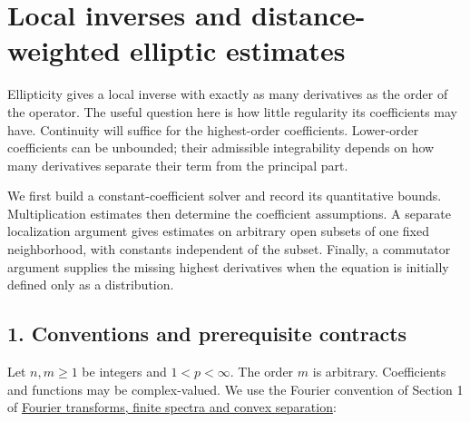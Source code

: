 \documentclass[
  11pt,
]{article}
\author{}
\date{}
\makeatletter
\let\ReaderOriginalAnchorStart\hyper@anchorstart
\let\ReaderOriginalAnchorEnd\hyper@anchorend
\let\ReaderPendingAliases\@empty
\def\ReaderArmAliases#1{\gdef\ReaderPendingAliases{#1}}
\def\hyper@anchorstart#1{\ReaderIfNativeAnchorTF{#1}{\ReaderPendingAliases\global\let\ReaderPendingAliases\@empty}{}\ReaderOriginalAnchorStart{#1}}
\makeatother
\begin{document}
\ReaderArmAliases{\ReaderOriginalAnchorStart{local-inverses-and-distance-weighted-elliptic-estimates}\ReaderOriginalAnchorEnd}
\section{Local inverses and distance-weighted elliptic
estimates}\label{local-inverses-and-distance-weighted-elliptic-estimates}

Ellipticity gives a local inverse with exactly as many derivatives as
the order of the operator. The useful question here is how little
regularity its coefficients may have. Continuity will suffice for the
highest-order coefficients. Lower-order coefficients can be unbounded;
their admissible integrability depends on how many derivatives separate
their term from the principal part.

We first build a constant-coefficient solver and record its quantitative
bounds. Multiplication estimates then determine the coefficient
assumptions. A separate localization argument gives estimates on
arbitrary open subsets of one fixed neighborhood, with constants
independent of the subset. Finally, a commutator argument supplies the
missing highest derivatives when the equation is initially defined only
as a distribution.

\ReaderArmAliases{\ReaderOriginalAnchorStart{AN03-LCE-001}\ReaderOriginalAnchorEnd\begingroup\expandafter\def\csname @currentHref\endcsname{AN03-LCE-001}\label{AN03-LCE-001}\endgroup\ReaderOriginalAnchorStart{an03-lce-001-conventions-and-prerequisite-contracts}\ReaderOriginalAnchorEnd\begingroup\expandafter\def\csname @currentHref\endcsname{an03-lce-001-conventions-and-prerequisite-contracts}\label{an03-lce-001-conventions-and-prerequisite-contracts}\endgroup\ReaderOriginalAnchorStart{1-conventions-and-prerequisite-contracts}\ReaderOriginalAnchorEnd\begingroup\expandafter\def\csname @currentHref\endcsname{1-conventions-and-prerequisite-contracts}\label{1-conventions-and-prerequisite-contracts}\endgroup\ReaderOriginalAnchorStart{conventions-and-prerequisite-contracts}\ReaderOriginalAnchorEnd}
\subsection{1. Conventions and prerequisite
contracts}\label{conventions-and-prerequisite-contracts}

Let \(n,m\geq1\) be integers and \(1<p<\infty\). The order \(m\) is
arbitrary. Coefficients and functions may be complex-valued. We use the
Fourier convention of Section 1 of
\href{prerequisite-bridges.pdf}{Fourier transforms, finite spectra and
convex separation}:
\end{document}
